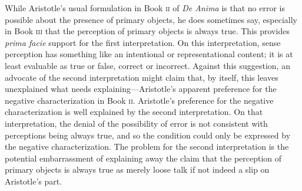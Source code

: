 While Aristotle's usual formulation in Book \textsc{ii} of \emph{De Anima} is that no error is possible about the presence of primary objects, he does sometimes say, especially in Book \textsc{iii} that the perception of primary objects is always true. This provides \emph{prima facie} support for the first interpretation. On this interpretation, sense perception has something like an intentional or representational content; it is at least evaluable as true or false, correct or incorrect. Against this suggestion, an advocate of the second interpretation might claim that, by itself, this leaves unexplained what needs explaining---\-Aristotle's apparent preference for the negative characterization in Book \textsc{ii}. Aristotle's preference for the negative characterization is well explained by the second interpretation. On that interpretation, the denial of the possibility of error is not consistent with perceptions being always true, and so the condition could only be expressed by the negative characterization. The problem for the second interpretation is the potential embarrassment of explaining away the claim that the perception of primary objects is always true as merely loose talk if not indeed a slip on Aristotle's part.

